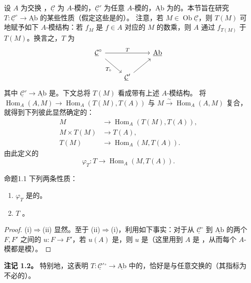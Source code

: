 设 $A$ 为交换 ，$\underline{\mathcal C}$ 为 $A$-模的，$\underline{\mathcal C}'$ 为任意 $A$-模的，$\underline{\mathrm{Ab}}$ 为的。本节旨在研究 $T:\underline{\mathcal C}^{\circ}\to\underline{\mathrm{Ab}}$ 的某些性质（假定这些是的）。
注意，若 $M\in\operatorname{Ob}\underline{\mathcal C}$，则 $T(M)$ 可地赋予如下 $A$-模结构：若 $f_M$ 是 $f\in A$ 对应的 $M$ 的数乘，则 $A$ 通过 $f_{T(M)}$ 于 $T(M)$。换言之，$T$ 为
\[
\begin{tikzcd}
\underline{\mathcal C}^{\circ}\arrow[rr,"T"]\arrow[dr,"T_{\circ}"']&&\underline{\mathrm{Ab}}\\
&\underline{\mathcal C}'\arrow[ur]&
\end{tikzcd}
\]
其中 $\underline{\mathcal C}'\to\underline{\mathrm{Ab}}$ 是。下文总将 $T(M)$ 看成带有上述 $A$-模结构。
将 $\operatorname{Hom}_A(A,M)\to\operatorname{Hom}_A(T(M),T(A))$ 与 $M\xrightarrow{\sim}\operatorname{Hom}_A(A,M)$ 复合，就得到下列彼此显然确定的：
\[
\begin{aligned}
M&\longrightarrow\operatorname{Hom}_A(T(M),T(A)),\\
M\times T(M)&\longrightarrow T(A),\\
T(M)&\longrightarrow\operatorname{Hom}_A(M,T(A)).
\end{aligned}
\]
由此定义的
\[\varphi_T:T\longrightarrow\operatorname{Hom}_A(M,T(A)).\]
\begin{SGAresult}{命题}{1.1}
下列两条性质：
\begin{enumerate}
\item[(i)] $\varphi_T$ 是的。
\item[(ii)] $T$ 。
\end{enumerate}
\end{SGAresult}
\begin{proof}
(i)$\Rightarrow$(ii) 显然。至于 (ii)$\Rightarrow$(i)，利用如下事实：对于从 $\underline{\mathcal C}^{\circ}$ 到 $\underline{\mathrm{Ab}}$ 的两个 $F,F'$ 之间的 $u:F\to F'$，若 $u(A)$ 是，则 $u$ 是（这里用到 $A$ 是 ，从而每个 $A$-模都是模）。
\end{proof}
\textbf{注记 1.2。} 特别地，这表明 $T:\underline{\mathcal C}'{}^{\circ}\to\underline{\mathrm{Ab}}$ 中的，恰好是与任意交换的（其指标为不必的）。

